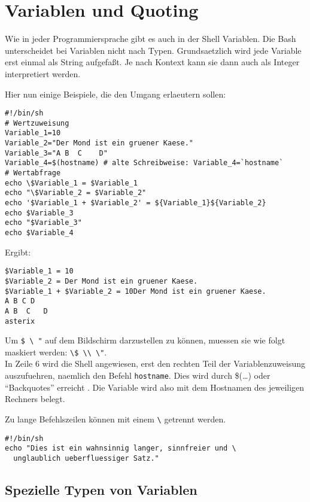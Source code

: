 \documentclass[12pt,]{article}
\begin{document}
\section{Variablen und Quoting}\label{variablen-und-quoting}

Wie in jeder Programmiersprache gibt es auch in der Shell Variablen. Die
Bash unterscheidet bei Variablen nicht nach Typen. Grundsaetzlich wird
jede Variable erst einmal als String aufgefaßt. Je nach Kontext kann sie
dann auch als Integer interpretiert werden.

Hier nun einige Beispiele, die den Umgang erlaeutern sollen:

\begin{verbatim}
#!/bin/sh
# Wertzuweisung
Variable_1=10
Variable_2="Der Mond ist ein gruener Kaese."
Variable_3="A B  C    D"
Variable_4=$(hostname) # alte Schreibweise: Variable_4=`hostname`
# Wertabfrage
echo \$Variable_1 = $Variable_1
echo "\$Variable_2 = $Variable_2"
echo '$Variable_1 + $Variable_2' = ${Variable_1}${Variable_2}
echo $Variable_3
echo "$Variable_3"
echo $Variable_4
\end{verbatim}

Ergibt:

\begin{verbatim}
$Variable_1 = 10
$Variable_2 = Der Mond ist ein gruener Kaese.
$Variable_1 + $Variable_2 = 10Der Mond ist ein gruener Kaese.
A B C D
A B  C   D
asterix
\end{verbatim}

Um \texttt{\$\ \textbackslash{}\ "} auf dem Bildschirm darzustellen zu
können, muessen sie wie folgt maskiert werden:
\texttt{\textbackslash{}\$\ \textbackslash{}\textbackslash{}\ \textbackslash{}"}.\\
In Zeile 6 wird die Shell angewiesen, erst den rechten Teil der
Variablenzuweisung auszufuehren, naemlich den Befehl \texttt{hostname}.
Dies wird durch \$(\ldots{}) oder ``Backquotes'' erreicht . Die Variable
wird also mit dem Hostnamen des jeweiligen Rechners belegt.

Zu lange Befehlszeilen können mit einem \texttt{\textbackslash{}}
getrennt werden.

\begin{verbatim}
#!/bin/sh
echo "Dies ist ein wahnsinnig langer, sinnfreier und \
  unglaublich ueberfluessiger Satz."
\end{verbatim}

\subsection{Spezielle Typen von
Variablen}\label{spezielle-typen-von-variablen}
\end{document}
